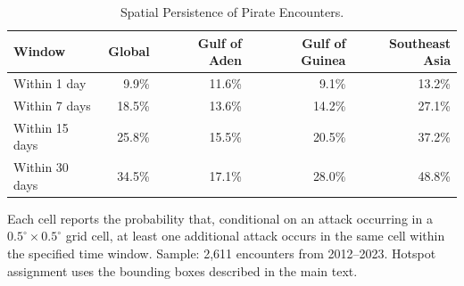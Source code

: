 \begin{table}[htbp]
\centering
\begin{threeparttable}
\caption{Spatial Persistence of Pirate Encounters.}
\label{tab:attack-persistence-rev}
\begin{tabular}{lrrrr}
\toprule
Window & Global & Gulf of Aden & Gulf of Guinea & Southeast Asia \\
\midrule
Within 1 day & 9.9\% & 11.6\% & 9.1\% & 13.2\% \\
Within 7 days & 18.5\% & 13.6\% & 14.2\% & 27.1\% \\
Within 15 days & 25.8\% & 15.5\% & 20.5\% & 37.2\% \\
Within 30 days & 34.5\% & 17.1\% & 28.0\% & 48.8\% \\
\bottomrule
\end{tabular}
\begin{tablenotes}
\item \scriptsize Each cell reports the probability that, conditional on an attack occurring in a $0.5^\circ \times 0.5^\circ$ grid cell, at least one additional attack occurs in the same cell within the specified time window. Sample: 2,611 encounters from 2012--2023. Hotspot assignment uses the bounding boxes described in the main text.
\end{tablenotes}
\end{threeparttable}
\end{table}
